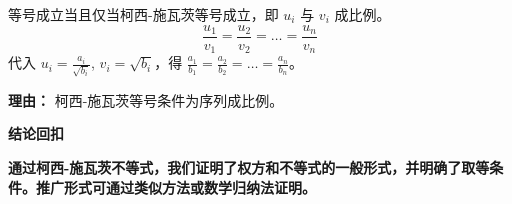\begin{proofbox}
\begin{description}[style=nextline, leftmargin=2.8em, labelsep=0.5em, itemsep=0.55em]
    \item[\textbf{步骤六（取等条件）：}] 等号成立当且仅当柯西-施瓦茨等号成立，即 $u_i$ 与 $v_i$ 成比例。
    \[
        \frac{u_1}{v_1} = \frac{u_2}{v_2} = \dots = \frac{u_n}{v_n}
    \]
    代入 $u_i = \frac{a_i}{\sqrt{b_i}}$, $v_i = \sqrt{b_i}$，得 $\frac{a_1}{b_1} = \frac{a_2}{b_2} = \dots = \frac{a_n}{b_n}$。
    \par\textbf{理由：}
    柯西-施瓦茨等号条件为序列成比例。
\end{description}

\medskip
\textbf{\textcolor{CProof}{结论回扣}}

\textbf{通过柯西-施瓦茨不等式，我们证明了权方和不等式的一般形式，并明确了取等条件。推广形式可通过类似方法或数学归纳法证明。}
\end{proofbox}
